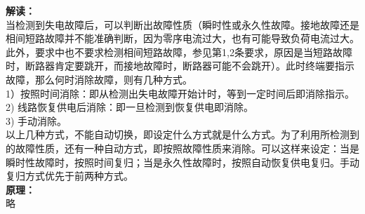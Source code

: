 \documentclass{article}
\begin{document}
\begin{CJK}{UTF8}{gbsn}
\begin{enumerate}
	\textbf{解读：}\\
	当检测到失电故障后，可以判断出故障性质（瞬时性或永久性故障。接地故障还是相间短路故障并不能准确判断，因为零序电流过大，也有可能导致负荷电流过大。此外，要求中也不要求检测相间短路故障，参见第1,2条要求，原因是当短路故障时，断路器肯定要跳开，而接地故障时，断路器可能不会跳开）。此时终端要指示故障，那么何时消除故障，则有几种方式。\\
	1）按照时间消除：即从检测出失电故障开始计时，等到一定时间后即消除指示。\\	2) 线路恢复供电后消除：即一旦检测到恢复供电即消除。\\
	3) 手动消除。\\
	以上几种方式，不能自动切换，即设定什么方式就是什么方式。为了利用所检测到的故障性质，还有一种自动方式，即按照故障性质来消除。可以这样来设定：当是瞬时性故障时，按照时间复归；当是永久性故障时，按照自动恢复供电复归。手动复归方式优先于前两种方式。\\
	\textbf{原理：}\\
	略


\end{enumerate}
\end{CJK}
\end{document}
